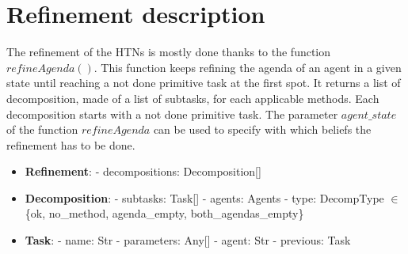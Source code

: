\section{Refinement description}


The refinement of the HTNs is mostly done thanks to the function $refineAgenda()$. This function keeps refining the agenda of an agent in a given state until reaching a not done primitive task at the first spot. It returns a list of decomposition, made of a list of subtasks, for each applicable methods. Each decomposition starts with a not done primitive task. The parameter $agent\_state$ of the function $refineAgenda$ can be used to specify with which beliefs the refinement has to be done. 

\begin{itemize}
    \item \textbf{Refinement}: 
    \subitem - decompositions: Decomposition[]
    
    \item \textbf{Decomposition}:
    \subitem - subtasks: Task[]
    \subitem - agents: Agents
    \subitem - type: DecompType $\in$ \{ok, no\_method, agenda\_empty, both\_agendas\_empty\}
    
    \item \textbf{Task}:
    \subitem - name: Str
    \subitem - parameters: Any[]
    \subitem - agent: Str
    \subitem - previous: Task
    
\end{itemize}